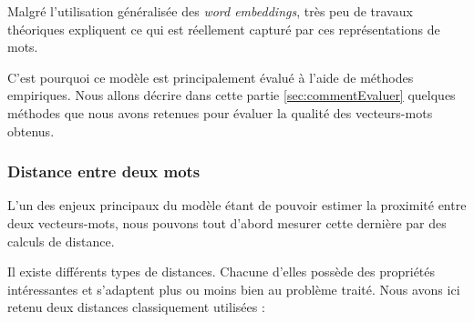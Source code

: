 \documentclass[11pt,french,french]{article}
\begin{document}
Malgré l'utilisation généralisée des \emph{word embeddings}, très peu de
travaux théoriques expliquent ce qui est réellement capturé par ces
représentations de mots.

C'est pourquoi ce modèle est principalement évalué à l'aide de méthodes
empiriques. Nous allons décrire dans cette partie
\ref{sec:commentEvaluer} quelques méthodes que nous avons retenues pour
évaluer la qualité des vecteurs-mots obtenus.

\subsubsection{Distance entre deux mots}\label{distance-entre-deux-mots}

L'un des enjeux principaux du modèle étant de pouvoir estimer la
proximité entre deux vecteurs-mots, nous pouvons tout d'abord mesurer
cette dernière par des calculs de distance.

Il existe différents types de distances. Chacune d'elles possède des
propriétés intéressantes et s'adaptent plus ou moins bien au problème
traité. Nous avons ici retenu deux distances classiquement utilisées :
\end{document}
